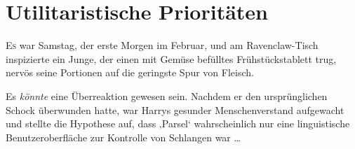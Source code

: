 \chapter{Utilitaristische Prioritäten}

\lettrine{E}{s} war Samstag, der erste Morgen im Februar, und am Ravenclaw-Tisch inspizierte ein Junge, der einen mit Gemüse befülltes Frühstückstablett trug, nervös seine Portionen auf die geringste Spur von Fleisch.

Es \emph{könnte} eine Überreaktion gewesen sein. Nachdem er den ursprünglichen Schock überwunden hatte, war Harrys gesunder Menschenverstand aufgewacht und stellte die Hypothese auf, dass ‚Parsel‘ wahrscheinlich nur eine linguistische Benutzeroberfläche zur Kontrolle von Schlangen war …

